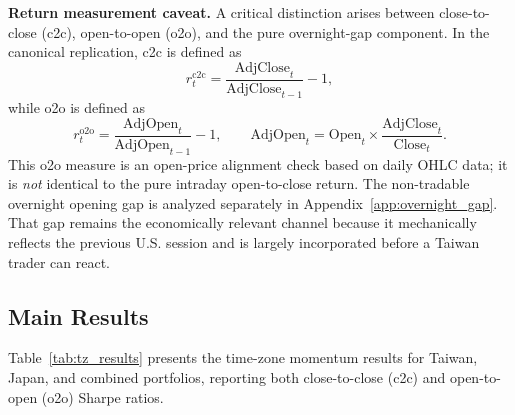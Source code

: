 \textbf{Return measurement caveat.} A critical distinction arises between close-to-close (c2c), open-to-open (o2o), and the pure overnight-gap component. In the canonical replication, c2c is defined as
\[
r_t^{\text{c2c}} = \frac{\text{AdjClose}_t}{\text{AdjClose}_{t-1}} - 1,
\]
while o2o is defined as
\[
r_t^{\text{o2o}} = \frac{\text{AdjOpen}_t}{\text{AdjOpen}_{t-1}} - 1, \qquad \text{AdjOpen}_t = \text{Open}_t \times \frac{\text{AdjClose}_t}{\text{Close}_t}.
\]
This o2o measure is an open-price alignment check based on daily OHLC data; it is \emph{not} identical to the pure intraday open-to-close return. The non-tradable overnight opening gap is analyzed separately in Appendix~\ref{app:overnight_gap}. That gap remains the economically relevant channel because it mechanically reflects the previous U.S. session and is largely incorporated before a Taiwan trader can react.

\subsection{Main Results}

Table~\ref{tab:tz_results} presents the time-zone momentum results for Taiwan, Japan, and combined portfolios, reporting both close-to-close (c2c) and open-to-open (o2o) Sharpe ratios.


